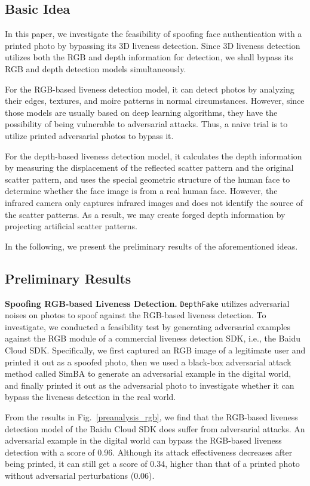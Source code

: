 \subsection{Basic Idea}
In this paper, we investigate the feasibility of spoofing face authentication with a printed photo by bypassing its 3D liveness detection.
Since 3D liveness detection utilizes both the RGB and depth information for detection, we shall bypass its RGB and depth detection models simultaneously.  

For the RGB-based liveness detection model, it can detect photos by analyzing their edges, textures, and moire patterns in normal circumstances. However, since those models are usually based on deep learning algorithms, they have the possibility of being vulnerable to adversarial attacks. Thus, a naive trial is to utilize printed adversarial photos to bypass it. 


For the depth-based liveness detection model, it calculates the depth information by measuring the displacement of the reflected scatter pattern and the original scatter pattern, and uses the special geometric structure of the human face to determine whether the face image is from a real human face.
However, the infrared camera only captures infrared images and does not identify the source of the scatter patterns. As a result,  we may create forged depth information by projecting artificial scatter patterns. 



In the following, we present the preliminary results of the aforementioned ideas.
\subsection{Preliminary Results }

\textbf{Spoofing RGB-based Liveness Detection.} \texttt{DepthFake} utilizes adversarial noises on photos to spoof against the RGB-based liveness detection.
To investigate, we conducted a feasibility test by generating adversarial examples against the RGB module of a commercial liveness detection SDK, i.e., the Baidu Cloud SDK. Specifically, we first captured an RGB image of a legitimate user and  printed it out as a spoofed photo, then we used a black-box adversarial attack method called SimBA \cite{guo2019simple} to generate an adversarial example in the digital world, and finally printed it out as the adversarial photo to investigate whether it can bypass the liveness detection in the real world. 

From the results in Fig.~\ref{preanalysis_rgb}, we find that the RGB-based liveness detection model of the Baidu Cloud SDK does suffer from adversarial attacks. An adversarial example in the digital world can bypass the RGB-based liveness detection with a score of 0.96. Although its attack effectiveness decreases after being printed, it can still get a score of 0.34, higher than that of a printed photo without adversarial perturbations (0.06). 

